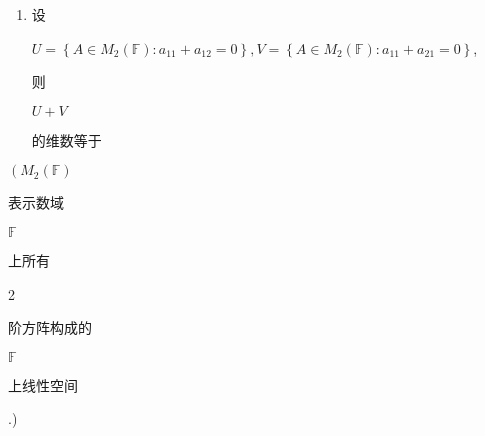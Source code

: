\documentclass[10pt]{article}
\begin{document}
\begin{enumerate}
  \item \begin{CJK}{UTF8}{mj}设\end{CJK} $U=\left\{A \in M_{2}(\mathbb{F}): a_{11}+a_{12}=0\right\}, V=\left\{A \in M_{2}(\mathbb{F}): a_{11}+a_{21}=0\right\}$, \begin{CJK}{UTF8}{mj}则\end{CJK} $U+V$ \begin{CJK}{UTF8}{mj}的维数等于\end{CJK}
\end{enumerate}
$\left(M_{2}(\mathbb{F})\right.$ \begin{CJK}{UTF8}{mj}表示数域\end{CJK} $\mathbb{F}$ \begin{CJK}{UTF8}{mj}上所有\end{CJK} 2 \begin{CJK}{UTF8}{mj}阶方阵构成的\end{CJK} $\mathbb{F}$ \begin{CJK}{UTF8}{mj}上线性空间\end{CJK}.)
\end{document}
